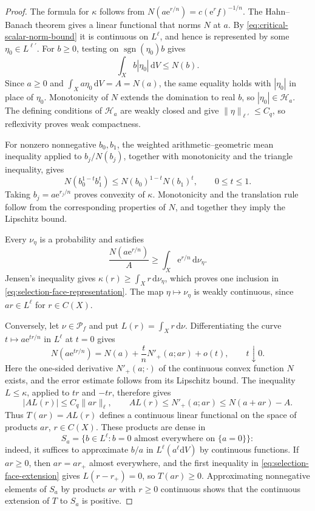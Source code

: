 \begin{proof}
The formula for $\kappa$ follows from $N(a\mathrm{e}^{r/n})=c(\mathrm{e}^rf)^{-1/n}$. The Hahn--Banach theorem gives a linear functional that norms $N$ at $a$. By \eqref{eq:critical-scalar-norm-bound} it is continuous on $L^\ell$, and hence is represented by some $\eta_0\in L^{\ell'}$. For $b\geq0$, testing on $\operatorname{sgn}(\eta_0)b$ gives
\[
 \int_Xb|\eta_0|\,\mathrm{d}V\leq N(b).
\]
Since $a\geq0$ and $\int_Xa\eta_0\,\mathrm{d}V=A=N(a)$, the same equality holds with $|\eta_0|$ in place of $\eta_0$. Monotonicity of $N$ extends the domination to real $b$, so $|\eta_0|\in\mathcal H_a$. The defining conditions of $\mathcal H_a$ are weakly closed and give $\|\eta\|_{\ell'}\leq C_q$, so reflexivity proves weak compactness.

For nonzero nonnegative $b_0,b_1$, the weighted arithmetic--geometric mean inequality applied to $b_j/N(b_j)$, together with monotonicity and the triangle inequality, gives
\[
 N(b_0^{1-t}b_1^t)\leq N(b_0)^{1-t}N(b_1)^t,\qquad 0\leq t\leq1.
\]
Taking $b_j=a\mathrm{e}^{r_j/n}$ proves convexity of $\kappa$. Monotonicity and the translation rule follow from the corresponding properties of $N$, and together they imply the Lipschitz bound.

Every $\nu_\eta$ is a probability and satisfies
\[
 \frac{N(a\mathrm{e}^{r/n})}{A}
       \geq\int_X\mathrm{e}^{r/n}\,\mathrm{d}\nu_\eta.
\]
Jensen's inequality gives $\kappa(r)\geq\int_Xr\,\mathrm{d}\nu_\eta$, which proves one inclusion in \eqref{eq:selection-face-representation}. The map $\eta\mapsto\nu_\eta$ is weakly continuous, since $ar\in L^\ell$ for $r\in C(X)$.

Conversely, let $\nu\in\mathcal P_f$ and put $L(r)=\int_Xr\,\mathrm{d}\nu$. Differentiating the curve $t\mapsto a\mathrm{e}^{tr/n}$ in $L^\ell$ at $t=0$ gives
\[
 N(a\mathrm{e}^{tr/n})
       =N(a)+\frac{t}{n}N'_+(a;ar)+o(t),\qquad t\downarrow0.
\]
Here the one-sided derivative $N'_+(a;\cdot)$ of the continuous convex function $N$ exists, and the error estimate follows from its Lipschitz bound. The inequality $L\leq\kappa$, applied to $tr$ and $-tr$, therefore gives
\begin{equation}\label{eq:selection-face-extension}
 |A L(r)|\leq C_q\|ar\|_\ell,\qquad
 A L(r)\leq N'_+(a;ar)\leq N(a+ar)-A.
\end{equation}
Thus $T(ar)=A L(r)$ defines a continuous linear functional on the space of products $ar$, $r\in C(X)$. These products are dense in
\[
 S_a=\{b\in L^\ell:b=0\text{ almost everywhere on }\{a=0\}\}:
\]
indeed, it suffices to approximate $b/a$ in $L^\ell(a^\ell\mathrm{d}V)$ by continuous functions. If $ar\geq0$, then $ar=ar_+$ almost everywhere, and the first inequality in \eqref{eq:selection-face-extension} gives $L(r-r_+)=0$, so $T(ar)\geq0$. Approximating nonnegative elements of $S_a$ by products $ar$ with $r\geq0$ continuous shows that the continuous extension of $T$ to $S_a$ is positive.


\end{proof}
